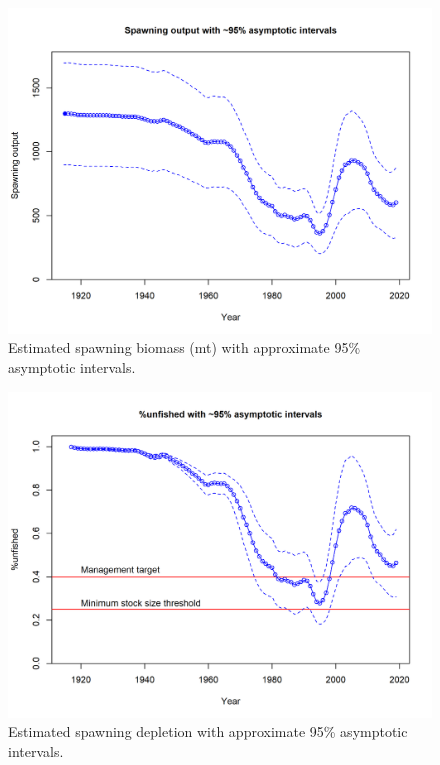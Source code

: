 \documentclass[12pt,]{article}
\begin{document}
\begin{figure}
\centering
\includegraphics{r4ss/plots_mod1/ts7_Spawning_output_with_95_asymptotic_intervals_intervals.png}
\caption{Estimated spawning biomass (mt) with approximate 95\%
asymptotic intervals.
\label{fig:ts7_Spawning_biomass_(mt)_with_95_asymptotic_intervals_intervals}}
\end{figure}

\begin{figure}
\centering
\includegraphics{r4ss/plots_mod1/ts9_unfished_with_95_asymptotic_intervals_intervals.png}
\caption{Estimated spawning depletion with approximate 95\% asymptotic
intervals.
\label{fig:ts9_unfished_with_95_asymptotic_intervals_intervals}}
\end{figure}
\end{document}
